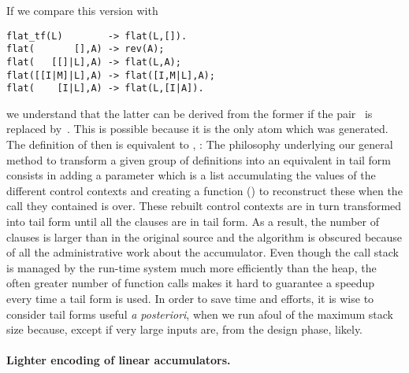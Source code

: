 If we compare this version with 
\begin{verbatim}
flat_tf(L)        -> flat(L,[]).
flat(       [],A) -> rev(A);
flat(   [[]|L],A) -> flat(L,A);
flat([[I|M]|L],A) -> flat([I,M|L],A);
flat(    [I|L],A) -> flat(L,[I|A]).
\end{verbatim}
we understand that the latter can be derived from the former if the
pair~ is replaced by~. This is possible
because it is the only atom which was generated. The definition
of  then is equivalent to ,
:
 The philosophy underlying our general method
to transform a given group of definitions into an equivalent in tail
form consists in adding a parameter which is a list accumulating the
values of the different control contexts and creating a function
() to reconstruct these when the call they contained
is over. These rebuilt control contexts are in turn transformed into
tail form until all the clauses are in tail form. As a result, the
number of clauses is larger than in the original source and the
algorithm is obscured because of all the administrative work about the
accumulator. Even though the call stack is managed by the
run\hyp{}time system much more efficiently than the heap, the often
greater number of function calls makes it hard to guarantee a speedup
every time a tail form is used. In order to save time and efforts, it
is wise to consider tail forms useful \emph{a posteriori}, when we run
afoul of the maximum stack size because, except if very large inputs
are, from the design phase, likely.

\medskip

\paragraph{Lighter encoding of linear accumulators.}
\label{tuples_vs_list}

